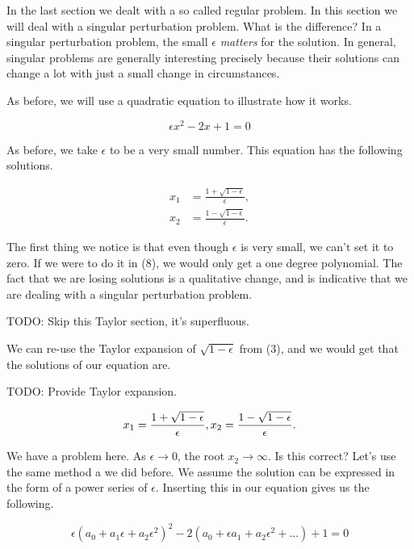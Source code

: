 \documentclass[12pt]{article}
\begin{document}
In the last section we dealt with a so called regular problem. In this section
we will deal with a singular perturbation problem. What is the difference? In a
singular perturbation problem, the small $\epsilon$ \textit{matters} for the
solution. In general, singular problems are generally interesting precisely
because their solutions can change a lot with just a small change in
circumstances.

As before, we will use a quadratic equation to illustrate how it works.

\begin{equation}
\epsilon x^2 - 2 x + 1 = 0
\end{equation}

As before, we take $\epsilon$ to be a very small number. This equation has the
following solutions.

\begin{align*}
x_1 &= \frac{1 + \sqrt{1 - \epsilon}}{\epsilon}, \\
x_2 &= \frac{1 - \sqrt{1 - \epsilon}}{\epsilon}.
\end{align*}

The first thing we notice is that even though $\epsilon$ is very small, we can't
set it to zero. If we were to do it in (8), we would only get a one degree
polynomial. The fact that we are losing solutions is a qualitative change, and
is indicative that we are dealing with a singular perturbation problem.

TODO: Skip this Taylor section, it's superfluous.

We can re-use the Taylor expansion of $\sqrt{1 - \epsilon}$ from (3), and we
would get that the solutions of our equation are.

TODO: Provide Taylor expansion.

\begin{equation}
x_1 = \frac{1 + \sqrt{1 - \epsilon}}{\epsilon}, \\
x_2 = \frac{1 - \sqrt{1 - \epsilon}}{\epsilon}.
\end{equation}

We have a problem here. As $\epsilon \to 0$, the root $x_2 \to \infty$. Is this
correct? Let's use the same method a we did before. We assume the solution can
be expressed in the form of a power series of $\epsilon$. Inserting this in our
equation gives us the following.

\begin{equation}
\epsilon (a_0 + a_1 \epsilon + a_2 \epsilon^2)^2 - 2(a_0 + \epsilon a_1 +
a_2 \epsilon^2 + ...) + 1 = 0
\end{equation}
\end{document}
